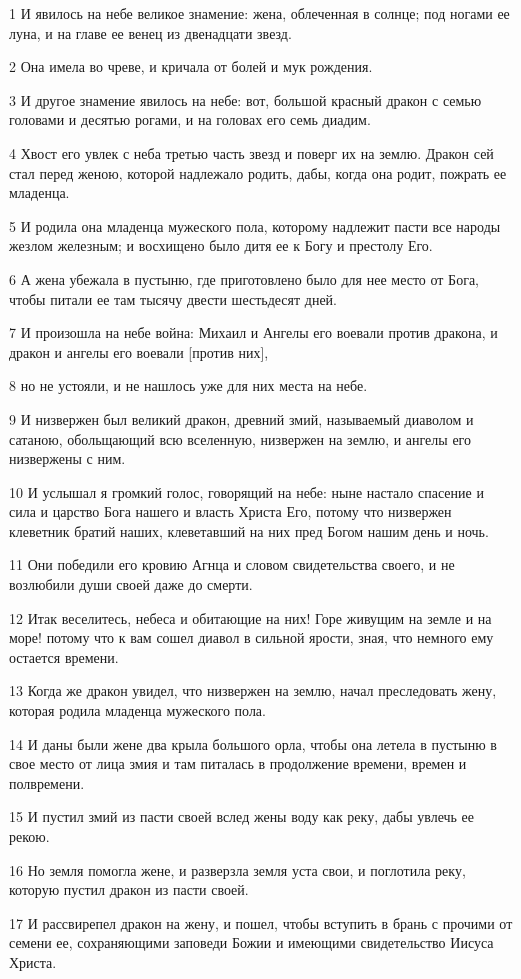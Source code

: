 \par 1 И явилось на небе великое знамение: жена, облеченная в солнце; под ногами ее луна, и на главе ее венец из двенадцати звезд.
\par 2 Она имела во чреве, и кричала от болей и мук рождения.
\par 3 И другое знамение явилось на небе: вот, большой красный дракон с семью головами и десятью рогами, и на головах его семь диадим.
\par 4 Хвост его увлек с неба третью часть звезд и поверг их на землю. Дракон сей стал перед женою, которой надлежало родить, дабы, когда она родит, пожрать ее младенца.
\par 5 И родила она младенца мужеского пола, которому надлежит пасти все народы жезлом железным; и восхищено было дитя ее к Богу и престолу Его.
\par 6 А жена убежала в пустыню, где приготовлено было для нее место от Бога, чтобы питали ее там тысячу двести шестьдесят дней.
\par 7 И произошла на небе война: Михаил и Ангелы его воевали против дракона, и дракон и ангелы его воевали [против них],
\par 8 но не устояли, и не нашлось уже для них места на небе.
\par 9 И низвержен был великий дракон, древний змий, называемый диаволом и сатаною, обольщающий всю вселенную, низвержен на землю, и ангелы его низвержены с ним.
\par 10 И услышал я громкий голос, говорящий на небе: ныне настало спасение и сила и царство Бога нашего и власть Христа Его, потому что низвержен клеветник братий наших, клеветавший на них пред Богом нашим день и ночь.
\par 11 Они победили его кровию Агнца и словом свидетельства своего, и не возлюбили души своей даже до смерти.
\par 12 Итак веселитесь, небеса и обитающие на них! Горе живущим на земле и на море! потому что к вам сошел диавол в сильной ярости, зная, что немного ему остается времени.
\par 13 Когда же дракон увидел, что низвержен на землю, начал преследовать жену, которая родила младенца мужеского пола.
\par 14 И даны были жене два крыла большого орла, чтобы она летела в пустыню в свое место от лица змия и там питалась в продолжение времени, времен и полвремени.
\par 15 И пустил змий из пасти своей вслед жены воду как реку, дабы увлечь ее рекою.
\par 16 Но земля помогла жене, и разверзла земля уста свои, и поглотила реку, которую пустил дракон из пасти своей.
\par 17 И рассвирепел дракон на жену, и пошел, чтобы вступить в брань с прочими от семени ее, сохраняющими заповеди Божии и имеющими свидетельство Иисуса Христа.

